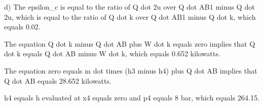 d) The epsilon_c is equal to the ratio of Q dot 2u over Q dot AB1 minus Q dot 2u, which is equal to the ratio of Q dot k over Q dot AB1 minus Q dot k, which equals 0.02.

The equation Q dot k minus Q dot AB plus W dot k equals zero implies that Q dot k equals Q dot AB minus W dot k, which equals 0.652 kilowatts.

The equation zero equals m dot times (h3 minus h4) plus Q dot AB implies that Q dot AB equals 28.652 kilowatts.

h4 equals h evaluated at x4 equals zero and p4 equals 8 bar, which equals 264.15.